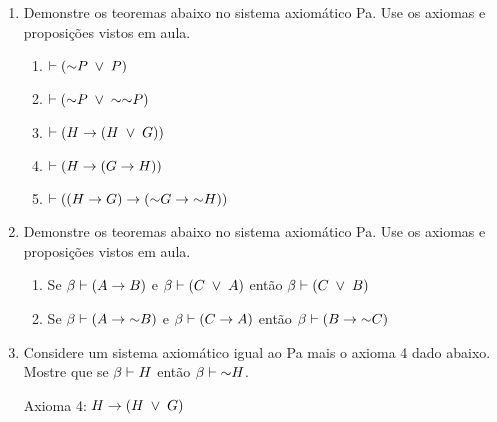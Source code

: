 \begin{enumerate}
  \item Demonstre os teoremas abaixo no sistema axiomático Pa. Use os axiomas e proposições vistos em aula.
    \begin{enumerate}
      \item $\vdash (\mathord{\sim} P \;\lor\; P)$
      \item $\vdash (\mathord{\sim} P \;\lor\; \mathord{\sim}\mathord{\sim} P)$
      \item $\vdash ( H \rightarrow (H \;\lor\; G) )$
      \item $\vdash ( H \rightarrow (G \rightarrow H) )$
      \item $\vdash ( (H \rightarrow G) \rightarrow (\mathord{\sim} G \rightarrow \mathord{\sim} H) )$
    \end{enumerate}
  \item Demonstre os teoremas abaixo no sistema axiomático Pa. Use os axiomas e proposições vistos em aula.
    \begin{enumerate}
      \item Se $\beta \vdash (A \rightarrow B)$ e $\beta \vdash (C \;\lor\; A)$ então $\beta \vdash (C \;\lor\; B)$
      \item Se $\beta \vdash (A \rightarrow \mathord{\sim} B)$ e $\beta \vdash (C \rightarrow A)$ então $\beta \vdash (B \rightarrow \mathord{\sim} C)$
    \end{enumerate}

  \item Considere um sistema axiomático igual ao Pa mais o axioma 4 dado abaixo. Mostre que se $\beta \vdash H$ então $\beta \vdash \mathord{\sim} H$.

    Axioma 4: $H \rightarrow (H \;\lor\; G)$
    
\end{enumerate}

    


